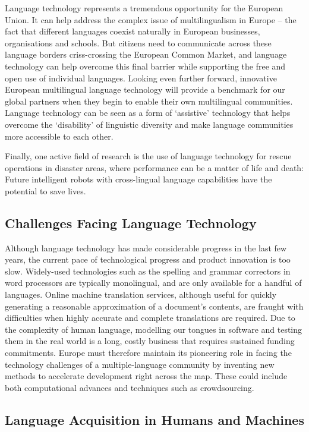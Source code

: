 \documentclass[]{../../metanetpaper}
\begin{document}
\begin{multicols}{2}
    Language technology represents a tremendous opportunity for the European Union. It can help address the complex issue of multilingualism in Europe – the fact that different languages coexist naturally in European businesses, organisations and schools. But citizens need to communicate across these language borders criss-crossing the European Common Market, and language technology can help overcome this final barrier while supporting the free and open use of individual languages. Looking even further forward, innovative European multilingual language technology will provide a benchmark for our global partners when they begin to enable their own multilingual communities. Language technology can be seen as a form of ‘assistive’ technology that helps overcome the ‘disability’ of linguistic diversity and make language communities more accessible to each other.

    Finally, one active field of research is the use of language technology for rescue operations in disaster areas, where performance can be a matter of life and death: Future intelligent robots with cross-lingual language capabilities have the potential to save lives.

\subsection{Challenges Facing Language Technology}

    Although language technology has made considerable progress in the last few years, the current pace of technological progress and product innovation is too slow. 
Widely-used technologies such as the spelling and grammar correctors in word processors are typically monolingual, and are only available for a handful of languages. Online machine translation services, although useful for quickly generating a reasonable approximation of a document’s contents, are fraught with difficulties when highly accurate and complete translations are required. Due to the complexity of human language, modelling our tongues in software and testing them in the real world is a long, costly business that requires sustained funding commitments. Europe must therefore maintain its pioneering role in facing the technology challenges of a multiple-language community by inventing new methods to accelerate development right across the map. These could include both computational advances and techniques such as crowdsourcing.

\subsection{Language Acquisition in Humans and Machines}


\end{multicols}
\end{document}
